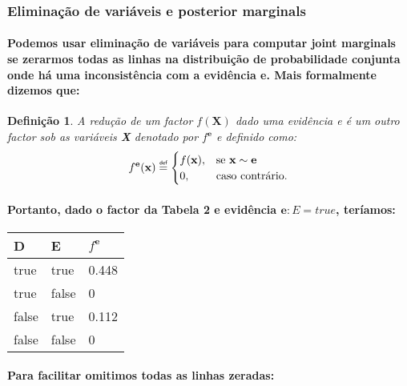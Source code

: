 \documentclass[a4paper,10pt]{article}
\newcommand\defeq{\mathrel{\overset{\makebox[0pt]{\mbox{\normalfont\tiny\sffamily def}}}{=}}}
\theoremstyle{plain}
\newtheorem*{spn-def}{Definição}
\begin{document}
\subsubsection{Eliminação de variáveis e posterior marginals}

\paragraph{
  Podemos usar eliminação de variáveis para computar joint marginals se zerarmos todas as linhas
  na distribuição de probabilidade conjunta onde há uma inconsistência\cite{report-2} com a 
  evidência \textbf{e}. Mais formalmente dizemos que:
}

\begin{spn-def} A redução de um factor $f(\textbf{X})$ dado uma evidência \textit{e} é um outro
  factor sob as variáveis \textbf{X} denotado por $f^{\textbf{e}}$ e definido como:
  \begin{equation}
    f^{\textbf{e}}(\textbf{x}) \defeq 
    \begin{cases}
      f(\textbf{x}), & \text{se $\textbf{x} \sim \textbf{e}$} \\
      0, & \text{caso contrário.} \\
    \end{cases}
  \end{equation}
\end{spn-def}

\paragraph{
  Portanto, dado o factor da Tabela 2 e evidência $\textbf{e}: E = true$, teríamos:
}

\begin{table}[h]
  \begin{center}
    \begin{tabular}{*{2}{l} | l}
      D & E & $f^\textbf{e}$ \\
      \hline
      true & true & 0.448 \\
      true & false & 0 \\
      false & true & 0.112 \\
      false & false & 0 \\
    \end{tabular}
  \end{center}
\end{table}

\newpage

\paragraph{
  Para facilitar omitimos todas as linhas zeradas:
}
\end{document}
